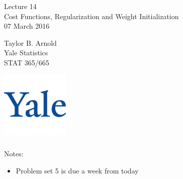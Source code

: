 \documentclass[xetex,mathserif,serif,aspectratio=169]{beamer}
\begin{document}
\begin{frame}[fragile] \frametitle{} \oldB \small

\vfill

{\fontsize{0.7cm}{0cm}\selectfont Lecture 14 \\\vspace{0.2cm} Cost Functions,
Regularization and Weight Initialization}\\\vspace{0.5cm}
07 March 2016

\vspace{2cm}

\begin{minipage}{0.6\textwidth}
Taylor B. Arnold \\
Yale Statistics \\
STAT 365/665
\end{minipage}
\hfill
\begin{minipage}{0.3\textwidth}\raggedleft
\includegraphics[scale=0.3]{../yale-logo.png}
\end{minipage}%

\end{frame}

\begin{frame}[fragile] \frametitle{} \oldB \small

Notes:
\begin{itemize}
\item Problem set 5 is due a week from today
\end{itemize}

\end{frame}
\end{document}
